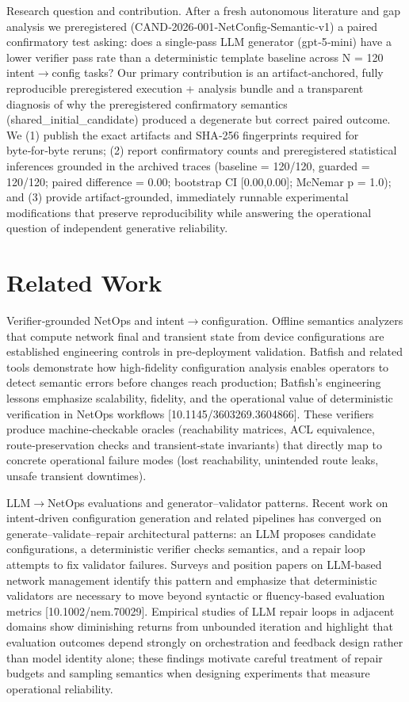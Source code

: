 \documentclass[conference]{IEEEtran}
\begin{document}
Research question and contribution. After a fresh autonomous literature and gap analysis we preregistered (CAND‑2026‑001‑NetConfig‑Semantic‑v1) a paired confirmatory test asking: does a single‑pass LLM generator (gpt‑5‑mini) have a lower verifier pass rate than a deterministic template baseline across N = 120 intent\ensuremath{\rightarrow}config tasks? Our primary contribution is an artifact‑anchored, fully reproducible preregistered execution + analysis bundle and a transparent diagnosis of why the preregistered confirmatory semantics (shared\_initial\_candidate) produced a degenerate but correct paired outcome. We (1) publish the exact artifacts and SHA‑256 fingerprints required for byte‑for‑byte reruns; (2) report confirmatory counts and preregistered statistical inferences grounded in the archived traces (baseline = 120/120, guarded = 120/120; paired difference = 0.00; bootstrap CI [0.00,0.00]; McNemar p = 1.0); and (3) provide artifact‑grounded, immediately runnable experimental modifications that preserve reproducibility while answering the operational question of independent generative reliability.

\section{Related Work}
Verifier‑grounded NetOps and intent\ensuremath{\rightarrow}configuration. Offline semantics analyzers that compute network final and transient state from device configurations are established engineering controls in pre‑deployment validation. Batfish and related tools demonstrate how high‑fidelity configuration analysis enables operators to detect semantic errors before changes reach production; Batfish's engineering lessons emphasize scalability, fidelity, and the operational value of deterministic verification in NetOps workflows [10.1145/3603269.3604866]. These verifiers produce machine‑checkable oracles (reachability matrices, ACL equivalence, route‑preservation checks and transient‑state invariants) that directly map to concrete operational failure modes (lost reachability, unintended route leaks, unsafe transient downtimes).

LLM\ensuremath{\rightarrow}NetOps evaluations and generator--validator patterns. Recent work on intent‑driven configuration generation and related pipelines has converged on generate--validate--repair architectural patterns: an LLM proposes candidate configurations, a deterministic verifier checks semantics, and a repair loop attempts to fix validator failures. Surveys and position papers on LLM‑based network management identify this pattern and emphasize that deterministic validators are necessary to move beyond syntactic or fluency‑based evaluation metrics [10.1002/nem.70029]. Empirical studies of LLM repair loops in adjacent domains show diminishing returns from unbounded iteration and highlight that evaluation outcomes depend strongly on orchestration and feedback design rather than model identity alone; these findings motivate careful treatment of repair budgets and sampling semantics when designing experiments that measure operational reliability.
\end{document}
